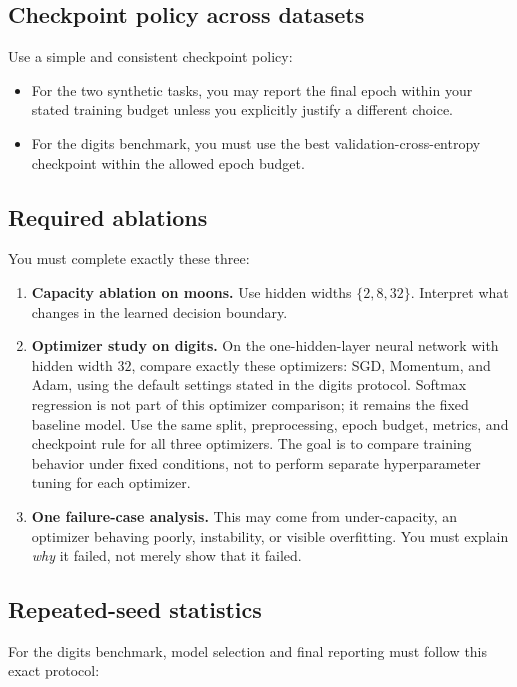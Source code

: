 \documentclass[11pt]{article}
\begin{document}
\subsection{Checkpoint policy across datasets}

Use a simple and consistent checkpoint policy:

\begin{itemize}
    \item For the two synthetic tasks, you may report the final epoch within your stated training budget unless you explicitly justify a different choice.
    \item For the digits benchmark, you must use the best validation-cross-entropy checkpoint within the allowed epoch budget.
\end{itemize}

\subsection{Required ablations}

You must complete exactly these three:

\begin{enumerate}
    \item \textbf{Capacity ablation on moons.} Use hidden widths \(\{2, 8, 32\}\). Interpret what changes in the learned decision boundary.
    \item \textbf{Optimizer study on digits.} On the one-hidden-layer neural network with hidden width \(32\), compare exactly these optimizers: SGD, Momentum, and Adam, using the default settings stated in the digits protocol. Softmax regression is not part of this optimizer comparison; it remains the fixed baseline model. Use the same split, preprocessing, epoch budget, metrics, and checkpoint rule for all three optimizers. The goal is to compare training behavior under fixed conditions, not to perform separate hyperparameter tuning for each optimizer.
    \item \textbf{One failure-case analysis.} This may come from under-capacity, an optimizer behaving poorly, instability, or visible overfitting. You must explain \emph{why} it failed, not merely show that it failed.
\end{enumerate}

\subsection{Repeated-seed statistics}

For the digits benchmark, model selection and final reporting must follow this exact protocol:
\end{document}
